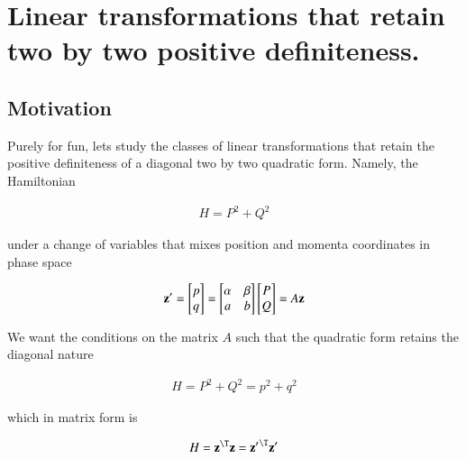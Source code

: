 

\chapter{Linear transformations that retain two by two positive definiteness.}
\label{chap:quadraticForm}
{}
\date{Oct 4, 2009}

\beginArtWithToc

\section{Motivation}

Purely for fun, lets study the classes of linear transformations that retain the positive definiteness of a diagonal two by two quadratic form.  Namely, the Hamiltonian

\begin{align}\label{eqn:hamiltonian:voo1}
H = P^2 + Q^2
\end{align}

under a change of variables that mixes position and momenta coordinates in phase space

\begin{align}\label{eqn:hamiltonian:voo2}
\mathbf{z}' =
\begin{bmatrix}
p \\
q
\end{bmatrix}
=
\begin{bmatrix}
\alpha & \beta \\
a      & b \\
\end{bmatrix}
\begin{bmatrix}
P \\
Q
\end{bmatrix}
= A \mathbf{z}
\end{align}

We want the conditions on the matrix $A$ such that the quadratic form retains the diagonal nature

\begin{align}\label{eqn:hamiltonian:voo3a}
H = P^2 + Q^2 = p^2 + q^2
\end{align}

which in matrix form is

\begin{align}\label{eqn:hamiltonian:voo3}
H = \Bz^\T \Bz = {\Bz'}^\T \Bz' 
\end{align}

